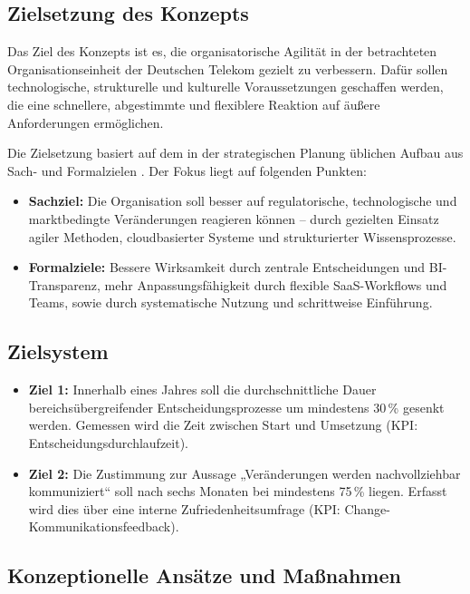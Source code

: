 \documentclass[12pt,a4paper]{article}
\begin{document}
\subsection{Zielsetzung des Konzepts}

Das Ziel des Konzepts ist es, die organisatorische Agilität in der betrachteten Organisationseinheit der Deutschen Telekom gezielt zu verbessern. Dafür sollen technologische, strukturelle und kulturelle Voraussetzungen geschaffen werden, die eine schnellere, abgestimmte und flexiblere Reaktion auf äußere Anforderungen ermöglichen.

\noindent Die Zielsetzung basiert auf dem in der strategischen Planung üblichen Aufbau aus Sach- und Formalzielen \parencite{StelzerDirk1962-2011I:GA}. Der Fokus liegt auf folgenden Punkten:

\begin{itemize}
	\item \textbf{Sachziel:} Die Organisation soll besser auf regulatorische, technologische und marktbedingte Veränderungen reagieren können – durch gezielten Einsatz agiler Methoden, cloudbasierter Systeme und strukturierter Wissensprozesse.
	\item \textbf{Formalziele:} Bessere Wirksamkeit durch zentrale Entscheidungen und BI-Transparenz, mehr Anpassungsfähigkeit durch flexible SaaS-Workflows und Teams, sowie durch systematische Nutzung und schrittweise Einführung.
\end{itemize}

\subsection{Zielsystem}\label{sec:zielsystem}

\begin{itemize}
	\item \textbf{Ziel 1:} Innerhalb eines Jahres soll die durchschnittliche Dauer bereichsübergreifender Entscheidungsprozesse um mindestens 30\,\% gesenkt werden. Gemessen wird die Zeit zwischen Start und Umsetzung (KPI: Entscheidungsdurchlaufzeit).
	
	\item \textbf{Ziel 2:} Die Zustimmung zur Aussage „Veränderungen werden nachvollziehbar kommuniziert“ soll nach sechs Monaten bei mindestens 75\,\% liegen. Erfasst wird dies über eine interne Zufriedenheitsumfrage (KPI: Change-Kommunikationsfeedback).
\end{itemize}

\subsection{Konzeptionelle Ansätze und Maßnahmen}
\end{document}

